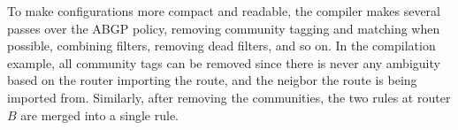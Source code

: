 To make configurations more compact and readable, the \sysname compiler makes several passes over the ABGP policy, removing community tagging and matching when possible, combining filters, removing dead filters, and so on. In the compilation example, all community tags can be removed since there is never any ambiguity based on the router importing the route, and the neigbor the route is being imported from. Similarly, after removing the communities, the two rules at router $B$ are merged into a single rule.